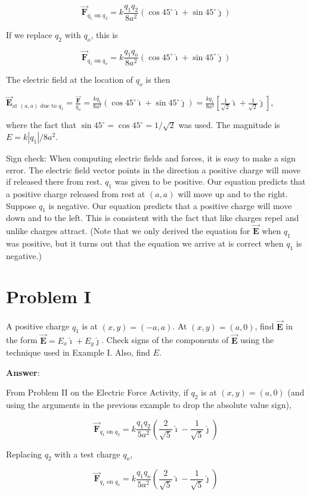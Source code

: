 \documentclass{article}
\newcommand{\ds}[0]{\displaystyle}
\newcommand{\ihat}[0]{\hat{\boldsymbol{\imath}}}
\newcommand{\jhat}[0]{\hat{\boldsymbol{\jmath}}}
\newcommand{\bfvec}[1]{\vec{\mathbf{#1}}}
\begin{document}
$$\bfvec{F}_{q_1\text{ on } q_2}=k\frac{q_1q_2}{8a^2}(\cos 45^\circ \ihat + \sin 45^\circ \jhat)$$

If we replace $q_2$ with $q_o$, this is

$$\bfvec{F}_{q_1\text{ on } q_o}=k\frac{q_1q_o}{8a^2}(\cos 45^\circ \ihat + \sin 45^\circ \jhat)$$

The electric field at the location of $q_o$ is then 

$\ds\bfvec{E}_{\text{at }(a,a) \text{ due to }q_1} = \frac{\bfvec{F}}{q_o} = \frac{kq_1}{8a^2}(\cos 45^\circ \ihat + \sin 45^\circ \jhat) =\frac{kq_1}{8a^2}\left[\frac{1}{\sqrt{2}}\ihat + \frac{1}{\sqrt{2}}\jhat\right]$,

where the fact that $\sin 45^\circ=\cos 45^\circ=1/\sqrt{2}$ was used. The magnitude is $E=k|q_1|/8a^2$.

Sign check: When computing electric fields and forces, it is easy to make a sign error. The electric field vector points in the direction a positive charge will move if released there from rest. $q_1$ was given to be positive. Our equation predicts that a positive charge released from rest at $(a, a)$ will move up and to the right. Suppose $q_1$ is negative. Our equation predicts that a positive charge will move down and to the left. This is consistent with the fact that like charges repel and unlike charges attract. (Note that we only derived the equation for $\bfvec{E}$ when $q_1$ was positive, but it turns out that the equation we arrive at is correct when $q_1$ is negative.)

\section{Problem I}

A positive charge $q_1$ is at $(x,y)=(-a,a)$. At $(x,y)=(a, 0)$, find $\bfvec{E}$ in the form $\bfvec{E}=E_x\ihat + E_y\jhat$. Check signs of the components of $\bfvec{E}$ using the technique used in Example I. Also, find $E$.

\ifsolutions
{\bf Answer}:

From Problem II on the Electric Force Activity, if $q_2$ is at $(x,y)=(a, 0)$ (and using the arguments in the previous example to drop the absolute value sign),

$$\bfvec{F}_{q_1\text{ on } q_2}=k\frac{q_1q_2}{5a^2}\left(\frac{2}{\sqrt{5}}\ihat -\frac{1}{\sqrt{5}}\jhat\right)$$

Replacing $q_2$ with a test charge $q_o$,

$$\bfvec{F}_{q_1\text{ on } q_o}=k\frac{q_1q_o}{5a^2}\left(\frac{2}{\sqrt{5}}\ihat -\frac{1}{\sqrt{5}}\jhat\right)$$
\end{document}
